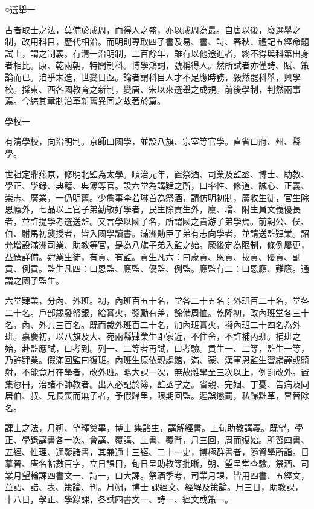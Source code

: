 
\begin{pinyinscope}
○選舉一

古者取士之法，莫備於成周，而得人之盛，亦以成周為最。自唐以後，廢選舉之制，改用科目，歷代相沿。而明則專取四子書及易、書、詩、春秋、禮記五經命題試士，謂之制義。有清一沿明制，二百餘年，雖有以他途進者，終不得與科第出身者相比。康、乾兩朝，特開制科。博學鴻詞，號稱得人。然所試者亦僅詩、賦、策論而已。洎乎末造，世變日亟。論者謂科目人才不足應時務，毅然罷科舉，興學校。採東、西各國教育之新制，變唐、宋以來選舉之成規。前後學制，判然兩事焉。今綜其章制沿革新舊異同之故著於篇。

學校一

有清學校，向沿明制。京師曰國學，並設八旗、宗室等官學。直省曰府、州、縣學。

世祖定鼎燕京，修明北監為太學。順治元年，置祭酒、司業及監丞、博士、助教、學正、學錄、典籍、典簿等官。設六堂為講肄之所，曰率性、修道、誠心、正義、崇志、廣業，一仍明舊。少詹事李若琳首為祭酒，請仿明初制，廣收生徒，官生除恩廕外，七品以上官子弟勤敏好學者，民生除貢生外，廩、增、附生員文義優長者，並許提學考選送監。又言學以國子名，所謂國之貴游子弟學焉。前朝公、侯、伯、駙馬初襲授者，皆入國學讀書。滿洲勛臣子弟有志向學者，並請送監肄業。詔允增設滿洲司業、助教等官，是為八旗子弟入監之始。厥後定為限制，條例屢更，益臻詳備。肄業生徒，有貢、有監。貢生凡六：曰歲貢、恩貢、拔貢、優貢、副貢、例貢。監生凡四：曰恩監、廕監、優監、例監。廕監有二：曰恩廕、難廕。通謂之國子監生。

六堂肄業，分內、外班。初，內班百五十名，堂各二十五名；外班百二十名，堂各二十名。戶部歲發帑銀，給膏火，獎勵有差，餘備周恤。乾隆初，改內班堂各三十名，內、外共三百名。既而裁外班百二十名，加內班膏火，撥內班二十四名為外班。嘉慶初，以八旗及大、宛兩縣肄業生距家近，不住舍，不許補內班。補班之始，赴監應試，曰考到。列一、二等者再試，曰考驗。貢生一、二等，監生一等，乃許肄業。假滿回監曰復班。內班生原依親處館，滿、蒙、漢軍恩監生習繙譯或騎射，不能竟月在學者，改外班。曠大課一次，無故離學至三次以上，例罰改外。置集愆冊，治諸不帥教者。出入必記於簿，監丞掌之。省親、完姻、丁憂、告病及同居伯、叔、兄長喪而無子者，予假歸里，限期回監。遲誤懲罰，私歸黜革，冒替除名。

課士之法，月朔、望釋奠畢，博士集諸生，講解經書。上旬助教講義。既望，學正、學錄講書各一次。會講、覆講、上書、覆背，月三回，周而復始。所習四書、五經、性理、通鑒諸書，其兼通十三經、二十一史，博極群書者，隨資學所詣。日摹晉、唐名帖數百字，立日課冊，旬日呈助教等批晰，朔、望呈堂查驗。祭酒、司業月望輪課四書文一、詩一，曰大課。祭酒季考，司業月課，皆用四書、五經文，並詔、誥、表、策論、判。月朔，博士課經文、經解及策論。月三日，助教課，十八日，學正、學錄課，各試四書文一、詩一、經文或策一。


\end{pinyinscope}
